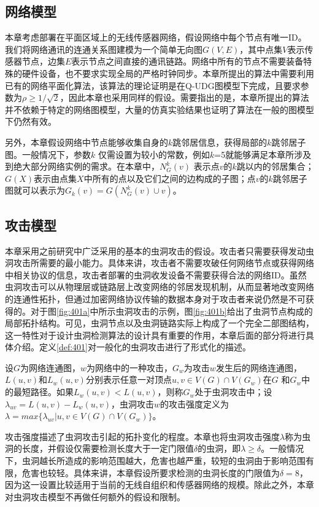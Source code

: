 \subsection{网络模型}
本章考虑部署在平面区域上的无线传感器网络，假设网络中每个节点有唯一ID。我们将网络通讯的连通关系图建模为一个简单无向图$G(V,E)$，其中点集$V$表示传感器节点，边集$E$表示节点之间直接的通讯链路。网络中所有的节点不需要装备特殊的硬件设备，也不要求实现全局的严格时钟同步。本章所提出的算法中需要利用已有的网络平面化算法，该算法的理论证明是在Q-UDG图模型下完成，且要求参数为$\rho\ge1/\sqrt{2}$，因此本章也采用同样的假设。需要指出的是，本章所提出的算法并不依赖于特定的网络图模型，大量的仿真实验结果也证明了算法在一般的图模型下仍然有效。

另外，本章假设网络中节点能够收集自身的$k$跳邻居信息，获得局部的$k$跳邻居子图。一般情况下，参数$k$ 仅需设置为较小的常数，例如$k$=5就能够满足本章所涉及到绝大部分网络实例的需求。在本章中，$N_G^k(v)$ 表示点$v$的$k$跳以内的邻居集合；$G(X)$表示由点集$X$中所有的点以及它们之间的边构成的子图；点$v$的$k$跳邻居子图就可以表示为$G_k(v)=G(N_G^k(v)\cup{v})$。
\subsection{攻击模型}
本章采用之前研究中广泛采用的基本的虫洞攻击的假设。攻击者只需要获得发动虫洞攻击所需要的最小能力。具体来讲，攻击者不需要攻破任何网络节点或获得网络中相关协议的信息，攻击者部署的虫洞收发设备不需要获得合法的网络ID。虽然虫洞攻击可以从物理层或链路层上改变网络的邻居发现机制，从而显著地改变网络的连通性拓扑，但通过加密网络协议传输的数据本身对于攻击者来说仍然是不可获得的。对于图\ref{fig:401a}中所示虫洞攻击的示例，图\ref{fig:401b}给出了虫洞节点构成的局部拓扑结构。可见，虫洞节点以及虫洞链路实际上构成了一个完全二部图结构，这一特性对于设计虫洞检测算法的设计具有重要的作用，本章后面的部分将进行具体介绍。定义\ref{def:401}对一般化的虫洞攻击进行了形式化的描述。
\begin{definition}\label{def:401}
设$G$为网络连通图，$w$为网络中的一种攻击，$G_w$为攻击$w$发生后的网络连通图，$L(u,v)$和$L_w(u,v)$分别表示任意一对顶点$u,v\in{V(G)\cap{V(G_w)}}$在$G$ 和$G_w$中的最短路径。如果$L_w(u,v)<L(u,v)$，则称$G_w$处于虫洞攻击中；设$\lambda_{uv}=L(u,v)-L_w(u,v)$，虫洞攻击$w$的攻击强度定义为$\lambda=max\{\lambda_{uv}|u,v\in{V(G)\cap{V(G_w)}}\}$。
\end{definition}

攻击强度描述了虫洞攻击引起的拓扑变化的程度。本章也将虫洞攻击强度$\lambda$称为虫洞的长度，并假设仅需要检测长度大于一定门限值$\delta$的虫洞，即$\lambda\ge\delta$。一般情况下，虫洞越长所造成的影响范围越大，危害也越严重，较短的虫洞由于影响范围有限，危害也较轻。具体来讲，本章假设所要求检测的虫洞长度的门限值为$\delta=8$，因为这一设置比较适用于当前的无线自组织和传感器网络的规模。除此之外，本章对虫洞攻击模型不再做任何额外的假设和限制。
